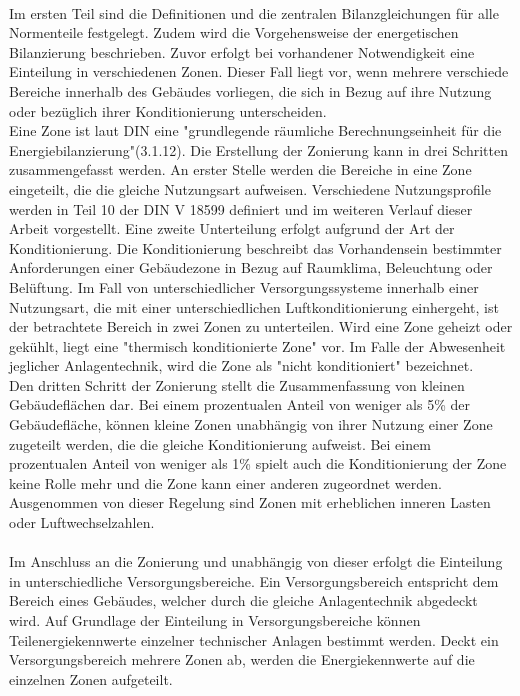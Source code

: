 \\
Im ersten Teil sind die Definitionen und die zentralen Bilanzgleichungen für alle Normenteile festgelegt. Zudem wird die Vorgehensweise der energetischen Bilanzierung beschrieben. Zuvor erfolgt bei vorhandener Notwendigkeit eine Einteilung in verschiedenen Zonen. Dieser Fall liegt vor, wenn mehrere verschiede Bereiche innerhalb des Gebäudes vorliegen, die sich in Bezug auf ihre Nutzung oder bezüglich ihrer Konditionierung unterscheiden.\\
Eine Zone ist laut DIN eine "grundlegende räumliche Berechnungseinheit für die Energiebilanzierung"(3.1.12). Die Erstellung der Zonierung kann in drei Schritten zusammengefasst werden. An erster Stelle werden die Bereiche in eine Zone eingeteilt, die die gleiche Nutzungsart aufweisen. Verschiedene Nutzungsprofile werden in Teil 10 der DIN V 18599 definiert und im weiteren Verlauf dieser Arbeit vorgestellt. Eine zweite Unterteilung erfolgt aufgrund der Art der Konditionierung. Die Konditionierung beschreibt das Vorhandensein bestimmter Anforderungen einer Gebäudezone in Bezug auf Raumklima, Beleuchtung oder Belüftung. Im Fall von unterschiedlicher Versorgungssysteme innerhalb einer Nutzungsart, die mit einer unterschiedlichen Luftkonditionierung einhergeht, ist der betrachtete Bereich in zwei Zonen zu unterteilen. Wird eine Zone geheizt oder gekühlt, liegt eine "thermisch konditionierte Zone" vor. Im Falle der Abwesenheit jeglicher Anlagentechnik, wird die Zone als "nicht konditioniert" bezeichnet. \\
Den dritten Schritt der Zonierung stellt die Zusammenfassung von kleinen Gebäudeflächen dar. Bei einem prozentualen Anteil von weniger als 5\% der Gebäudefläche, können kleine Zonen unabhängig von ihrer Nutzung einer Zone zugeteilt werden, die die gleiche Konditionierung aufweist. Bei einem prozentualen Anteil von weniger als 1\% spielt auch die Konditionierung der Zone keine Rolle mehr und die Zone kann einer anderen zugeordnet werden. Ausgenommen von dieser Regelung sind Zonen mit erheblichen inneren Lasten oder Luftwechselzahlen.\\
\\
Im Anschluss an die Zonierung und unabhängig von dieser erfolgt die Einteilung in unterschiedliche Versorgungsbereiche. Ein Versorgungsbereich entspricht dem Bereich eines Gebäudes, welcher durch die gleiche Anlagentechnik abgedeckt wird. Auf Grundlage der Einteilung in Versorgungsbereiche können Teilenergiekennwerte einzelner technischer Anlagen bestimmt werden. Deckt ein Versorgungsbereich mehrere Zonen ab, werden die Energiekennwerte auf die einzelnen Zonen aufgeteilt. \\
